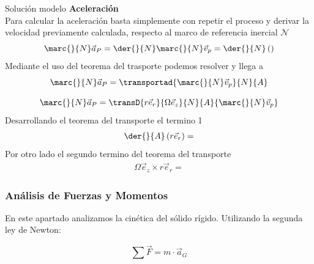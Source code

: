 \begin{solucion}{Solución modelo}
        \textbf{Aceleración}\\ %
        Para calcular la aceleración basta simplemente con repetir el proceso y derivar la velocidad previamente calculada, respecto al marco de referencia inercial $\mathcal{N}$
        \begin{equation}
            \marc{}{N}\vec{a}_P=\der{}{N}\marc{}{N}\vec{v}_p=\der{}{N}\left(\right)
        \end{equation}
        Mediante el uso del teorema del trasporte podemos resolver y llega a 
        \begin{equation}
            \marc{}{N}\vec{a}_P=\transportad{\marc{}{N}\vec{v}_p}{N}{A}
        \end{equation}
        
        
        
        \begin{equation}
            \marc{}{N}\vec{a}_P=\transD{r\vec{e}_r}{\Omega\vec{e}_z}{N}{A}{\marc{}{N}\vec{v}_p}
        \end{equation}
        Desarrollando el teorema del transporte el termino 1
        \begin{align}
            \der{}{A}\left(r\vec{e}_r\right)=
        \end{align}
        Por otro lado el segundo termino del teorema del transporte
        \begin{align}
            \Omega\vec{e}_z\times r\vec{e}_r=
        \end{align}

    
    \subsubsection*{Análisis de Fuerzas y Momentos}
        En este apartado analizamos la cinética del sólido rígido. 
        Utilizando la segunda ley de Newton:
        
        \begin{equation}
            \sum \vec{F} = m \cdot \vec{a}_G
        \end{equation}
        
\begin{center}
    \begin{tikzpicture}[
        scale=1.2,       %
        >=latex,         %
        very thick       %
    ]


\end{tikzpicture}
\end{center}
\end{solucion}

